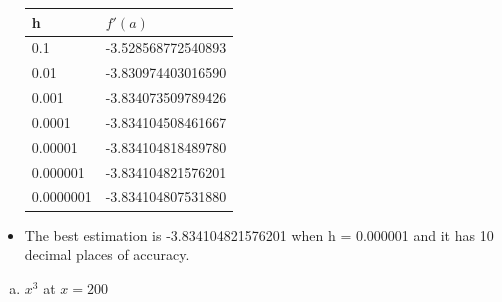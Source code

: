 \documentclass[12pt,en,a4paper]{article}
\begin{document}
\begin{itemize}
		\begin{table}[!h]
			\centering
			\begin{tabular}{|l|l|}
				\hline
				h & \(f'(a)\) \\ \hline
				0.1 & -3.528568772540893 \\ \hline
				0.01 & -3.830974403016590 \\ \hline
				0.001 & -3.834073509789426 \\ \hline
				0.0001 & -3.834104508461667 \\ \hline
				0.00001 & -3.834104818489780 \\ \hline
				0.000001 & -3.834104821576201 \\ \hline
				0.0000001 & -3.834104807531880 \\ \hline
			\end{tabular}
		\end{table}
		\item The best estimation is -3.834104821576201 when h = 0.000001 and it has 10 decimal places of accuracy.
	\end{itemize}
	\begin{enumerate}[c)]
		\item \(x^{3}\) at \(x=200\)
	\end{enumerate}
\end{document}

